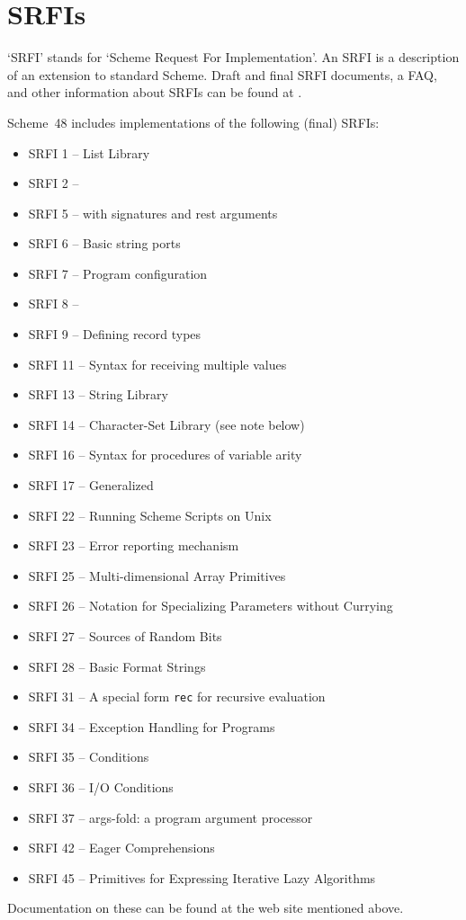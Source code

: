 \section{SRFIs}

`SRFI' stands for `Scheme Request For Implementation'.
An SRFI is a description of an extension to standard Scheme.
Draft and final SRFI documents, a FAQ, and other information about SRFIs
 can be found at
.

Scheme~48 includes implementations of the following (final) SRFIs:
\begin{itemize}
\item SRFI 1 -- List Library
\item SRFI 2 -- 
\item SRFI 5 --  with signatures and rest arguments
\item SRFI 6 -- Basic string ports
\item SRFI 7 -- Program configuration
\item SRFI 8 -- 
\item SRFI 9 -- Defining record types
\item SRFI 11 -- Syntax for receiving multiple values 
\item SRFI 13 -- String Library
\item SRFI 14 -- Character-Set Library (see note below)
\item SRFI 16 -- Syntax for procedures of variable arity
\item SRFI 17 -- Generalized 
\item SRFI 22 -- Running Scheme Scripts on Unix
\item SRFI 23 -- Error reporting mechanism
\item SRFI 25 -- Multi-dimensional Array Primitives 
\item SRFI 26 -- Notation for Specializing Parameters without Currying
\item SRFI 27 -- Sources of Random Bits
\item SRFI 28 -- Basic Format Strings
\item SRFI 31 -- A special form \texttt{rec} for recursive evaluation
\item SRFI 34 -- Exception Handling for Programs
\item SRFI 35 -- Conditions
\item SRFI 36 -- I/O Conditions
\item SRFI 37 -- args-fold: a program argument processor
\item SRFI 42 -- Eager Comprehensions
\item SRFI 45 -- Primitives for Expressing Iterative Lazy Algorithms
\end{itemize}
Documentation on these can be found at the web site mentioned above.

